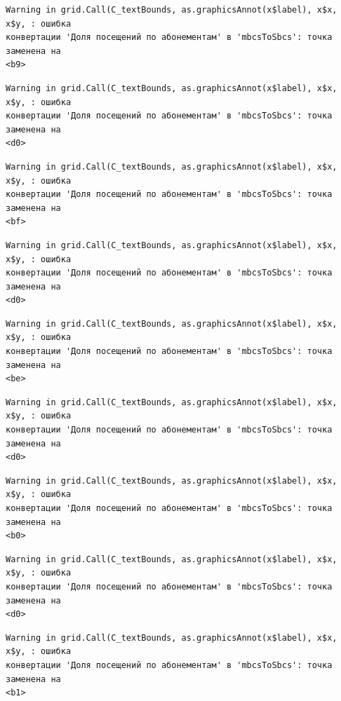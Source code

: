 \documentclass[
  letterpaper,
  DIV=11,
  numbers=noendperiod]{scrreprt}
\begin{document}
\begin{verbatim}
Warning in grid.Call(C_textBounds, as.graphicsAnnot(x$label), x$x, x$y, : ошибка
конвертации 'Доля посещений по абонементам' в 'mbcsToSbcs': точка заменена на
<b9>
\end{verbatim}

\begin{verbatim}
Warning in grid.Call(C_textBounds, as.graphicsAnnot(x$label), x$x, x$y, : ошибка
конвертации 'Доля посещений по абонементам' в 'mbcsToSbcs': точка заменена на
<d0>
\end{verbatim}

\begin{verbatim}
Warning in grid.Call(C_textBounds, as.graphicsAnnot(x$label), x$x, x$y, : ошибка
конвертации 'Доля посещений по абонементам' в 'mbcsToSbcs': точка заменена на
<bf>
\end{verbatim}

\begin{verbatim}
Warning in grid.Call(C_textBounds, as.graphicsAnnot(x$label), x$x, x$y, : ошибка
конвертации 'Доля посещений по абонементам' в 'mbcsToSbcs': точка заменена на
<d0>
\end{verbatim}

\begin{verbatim}
Warning in grid.Call(C_textBounds, as.graphicsAnnot(x$label), x$x, x$y, : ошибка
конвертации 'Доля посещений по абонементам' в 'mbcsToSbcs': точка заменена на
<be>
\end{verbatim}

\begin{verbatim}
Warning in grid.Call(C_textBounds, as.graphicsAnnot(x$label), x$x, x$y, : ошибка
конвертации 'Доля посещений по абонементам' в 'mbcsToSbcs': точка заменена на
<d0>
\end{verbatim}

\begin{verbatim}
Warning in grid.Call(C_textBounds, as.graphicsAnnot(x$label), x$x, x$y, : ошибка
конвертации 'Доля посещений по абонементам' в 'mbcsToSbcs': точка заменена на
<b0>
\end{verbatim}

\begin{verbatim}
Warning in grid.Call(C_textBounds, as.graphicsAnnot(x$label), x$x, x$y, : ошибка
конвертации 'Доля посещений по абонементам' в 'mbcsToSbcs': точка заменена на
<d0>
\end{verbatim}

\begin{verbatim}
Warning in grid.Call(C_textBounds, as.graphicsAnnot(x$label), x$x, x$y, : ошибка
конвертации 'Доля посещений по абонементам' в 'mbcsToSbcs': точка заменена на
<b1>
\end{verbatim}
\end{document}
